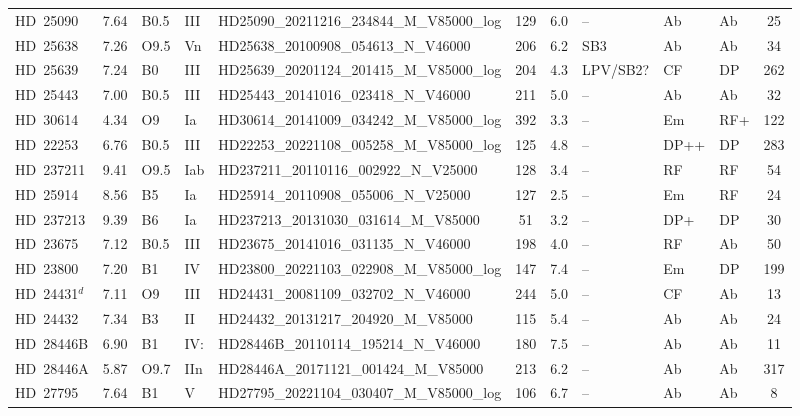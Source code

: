 {\begin{landscape}
\begin{longtable}{lclllcclllc}
\noalign{\smallskip}
HD~25090 & 7.64 & B0.5 & III & HD25090\_20211216\_234844\_M\_V85000\_log & 129 & 6.0 & -- & Ab & Ab & 25 \\
\noalign{\smallskip}
HD~25638 & 7.26 & O9.5 & Vn & HD25638\_20100908\_054613\_N\_V46000 & 206 & 6.2 & SB3 & Ab & Ab & 34 \\
\noalign{\smallskip}
HD~25639 & 7.24 & B0 & III & HD25639\_20201124\_201415\_M\_V85000\_log & 204 & 4.3 & LPV/SB2? & CF & DP & 262 \\
\noalign{\smallskip}
HD~25443 & 7.00 & B0.5 & III & HD25443\_20141016\_023418\_N\_V46000 & 211 & 5.0 & -- & Ab & Ab & 32 \\
\noalign{\smallskip}
HD~30614 & 4.34 & O9 & Ia & HD30614\_20141009\_034242\_M\_V85000\_log & 392 & 3.3 & -- & Em & RF+ & 122 \\
\noalign{\smallskip}
HD~22253 & 6.76 & B0.5 & III & HD22253\_20221108\_005258\_M\_V85000\_log & 125 & 4.8 & -- & DP++ & DP & 283 \\
\noalign{\smallskip}
HD~237211 & 9.41 & O9.5 & Iab & HD237211\_20110116\_002922\_N\_V25000 & 128 & 3.4 & -- & RF & RF & 54 \\
\noalign{\smallskip}
HD~25914 & 8.56 & B5 & Ia & HD25914\_20110908\_055006\_N\_V25000 & 127 & 2.5 & -- & Em & RF & 24 \\
\noalign{\smallskip}
HD~237213 & 9.39 & B6 & Ia & HD237213\_20131030\_031614\_M\_V85000 & 51 & 3.2 & -- & DP+ & DP & 30 \\
\noalign{\smallskip}
HD~23675 & 7.12 & B0.5 & III & HD23675\_20141016\_031135\_N\_V46000 & 198 & 4.0 & -- & RF & Ab & 50 \\
\noalign{\smallskip}
HD~23800 & 7.20 & B1 & IV & HD23800\_20221103\_022908\_M\_V85000\_log & 147 & 7.4 & -- & Em & DP & 199 \\
\noalign{\smallskip}
HD~24431$^{d}$ & 7.11 & O9 & III & HD24431\_20081109\_032702\_N\_V46000 & 244 & 5.0 & -- & CF & Ab & 13 \\
\noalign{\smallskip}
HD~24432 & 7.34 & B3 & II & HD24432\_20131217\_204920\_M\_V85000 & 115 & 5.4 & -- & Ab & Ab & 24 \\
\noalign{\smallskip}
HD~28446B & 6.90 & B1 & IV: & HD28446B\_20110114\_195214\_N\_V46000 & 180 & 7.5 & -- & Ab & Ab & 11 \\
\noalign{\smallskip}
HD~28446A & 5.87 & O9.7 & IIn & HD28446A\_20171121\_001424\_M\_V85000 & 213 & 6.2 & -- & Ab & Ab & 317 \\
\noalign{\smallskip}
HD~27795 & 7.64 & B1 & V & HD27795\_20221104\_030407\_M\_V85000\_log & 106 & 6.7 & -- & Ab & Ab & 8 \\

\end{longtable}
\end{landscape}}
